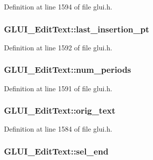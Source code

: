 Definition at line 1594 of file glui.\+h.

\hypertarget{class_g_l_u_i___edit_text_a66e1c808ae9587293d0a17208e7eb1db}{
\subsubsection[{last\+\_\+insertion\+\_\+pt}]{ G\+L\+U\+I\+\_\+\+Edit\+Text\+::last\+\_\+insertion\+\_\+pt}}\label{class_g_l_u_i___edit_text_a66e1c808ae9587293d0a17208e7eb1db}


Definition at line 1592 of file glui.\+h.

\hypertarget{class_g_l_u_i___edit_text_a233d380e8b9fed7d5d1314888525297d}{
\subsubsection[{num\+\_\+periods}]{ G\+L\+U\+I\+\_\+\+Edit\+Text\+::num\+\_\+periods}}\label{class_g_l_u_i___edit_text_a233d380e8b9fed7d5d1314888525297d}


Definition at line 1591 of file glui.\+h.

\hypertarget{class_g_l_u_i___edit_text_ab65d3fccc51fefbfaf9da1dcd5ab8788}{
\subsubsection[{orig\+\_\+text}]{ G\+L\+U\+I\+\_\+\+Edit\+Text\+::orig\+\_\+text}}\label{class_g_l_u_i___edit_text_ab65d3fccc51fefbfaf9da1dcd5ab8788}


Definition at line 1584 of file glui.\+h.

\hypertarget{class_g_l_u_i___edit_text_ae757e323598b216dd656acb6bd36ce03}{
\subsubsection[{sel\+\_\+end}]{ G\+L\+U\+I\+\_\+\+Edit\+Text\+::sel\+\_\+end}}\label{class_g_l_u_i___edit_text_ae757e323598b216dd656acb6bd36ce03}


